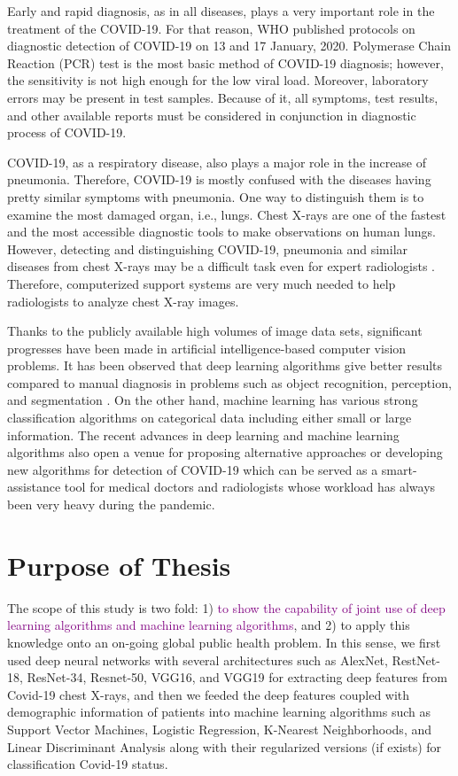 Early and rapid diagnosis, as in all diseases, plays a very important role in the treatment of the COVID-19. For that reason, WHO published protocols on diagnostic detection of COVID-19 on 13 and 17 January, 2020. Polymerase Chain Reaction (PCR) test \cite{pcr_cleveland_clinic} is the most basic method of COVID-19 diagnosis; however, the sensitivity is not high enough for the low viral load. Moreover, laboratory errors may be present in test samples. Because of it, all symptoms, test results, and other available reports must be considered in conjunction in diagnostic process of COVID-19.

COVID-19, as a respiratory disease, also plays a major role in the increase of pneumonia. Therefore, COVID-19 is mostly confused with the diseases having pretty similar symptoms with pneumonia. One way to distinguish them is to examine the most damaged organ, i.e., lungs. Chest X-rays are one of the fastest and the most accessible diagnostic tools to make observations on human lungs. However, detecting and distinguishing COVID-19, pneumonia and similar diseases from chest X-rays may be a difficult task even for expert radiologists \cite{covid_vs_pneumonia}. Therefore, computerized support systems are very much needed to help radiologists to analyze chest X-ray images. 

Thanks to the publicly available high volumes of image data sets, significant progresses have been made in artificial intelligence-based computer vision problems. It has been observed that deep learning algorithms give better results compared to manual diagnosis in problems such as object recognition, perception, and segmentation \cite{success_of_dl}. On the other hand, machine learning has various strong classification algorithms on categorical data including either small or large information. The recent advances in deep learning and machine learning algorithms also open a venue for proposing alternative approaches or developing new algorithms for detection of COVID-19 which can be served as a smart-assistance tool for medical doctors and radiologists whose workload has always been very heavy during the pandemic.

\section{Purpose of Thesis}\label{purposeofthesis}

The scope of this study is two fold: 1) \textcolor{purple}{to show the capability of joint use of deep learning algorithms and machine learning algorithms}, and 2) to apply this knowledge onto an on-going global public health problem. In this sense, we first used deep neural networks with several architectures such as AlexNet, RestNet-18, ResNet-34, Resnet-50, VGG16, and VGG19 for extracting deep features from Covid-19 chest X-rays, and then  
we feeded the deep features coupled with demographic information of patients into machine learning algorithms  such as Support Vector Machines, Logistic Regression, K-Nearest Neighborhoods, and Linear Discriminant Analysis along with their regularized versions (if exists) for  classification Covid-19 status.

